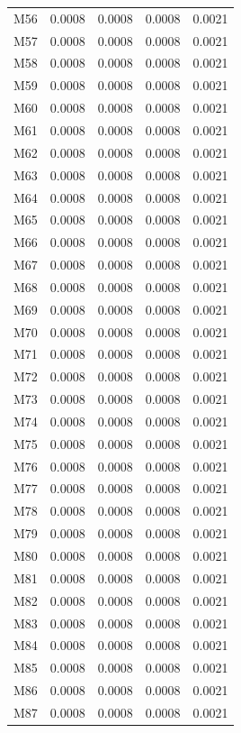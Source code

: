 \begin{longtable}{lrrrr}
M56 & 0.0008 & 0.0008 & 0.0008 & 0.0021 \\
M57 & 0.0008 & 0.0008 & 0.0008 & 0.0021 \\
M58 & 0.0008 & 0.0008 & 0.0008 & 0.0021 \\
M59 & 0.0008 & 0.0008 & 0.0008 & 0.0021 \\
M60 & 0.0008 & 0.0008 & 0.0008 & 0.0021 \\
M61 & 0.0008 & 0.0008 & 0.0008 & 0.0021 \\
M62 & 0.0008 & 0.0008 & 0.0008 & 0.0021 \\
M63 & 0.0008 & 0.0008 & 0.0008 & 0.0021 \\
M64 & 0.0008 & 0.0008 & 0.0008 & 0.0021 \\
M65 & 0.0008 & 0.0008 & 0.0008 & 0.0021 \\
M66 & 0.0008 & 0.0008 & 0.0008 & 0.0021 \\
M67 & 0.0008 & 0.0008 & 0.0008 & 0.0021 \\
M68 & 0.0008 & 0.0008 & 0.0008 & 0.0021 \\
M69 & 0.0008 & 0.0008 & 0.0008 & 0.0021 \\
M70 & 0.0008 & 0.0008 & 0.0008 & 0.0021 \\
M71 & 0.0008 & 0.0008 & 0.0008 & 0.0021 \\
M72 & 0.0008 & 0.0008 & 0.0008 & 0.0021 \\
M73 & 0.0008 & 0.0008 & 0.0008 & 0.0021 \\
M74 & 0.0008 & 0.0008 & 0.0008 & 0.0021 \\
M75 & 0.0008 & 0.0008 & 0.0008 & 0.0021 \\
M76 & 0.0008 & 0.0008 & 0.0008 & 0.0021 \\
M77 & 0.0008 & 0.0008 & 0.0008 & 0.0021 \\
M78 & 0.0008 & 0.0008 & 0.0008 & 0.0021 \\
M79 & 0.0008 & 0.0008 & 0.0008 & 0.0021 \\
M80 & 0.0008 & 0.0008 & 0.0008 & 0.0021 \\
M81 & 0.0008 & 0.0008 & 0.0008 & 0.0021 \\
M82 & 0.0008 & 0.0008 & 0.0008 & 0.0021 \\
M83 & 0.0008 & 0.0008 & 0.0008 & 0.0021 \\
M84 & 0.0008 & 0.0008 & 0.0008 & 0.0021 \\
M85 & 0.0008 & 0.0008 & 0.0008 & 0.0021 \\
M86 & 0.0008 & 0.0008 & 0.0008 & 0.0021 \\
M87 & 0.0008 & 0.0008 & 0.0008 & 0.0021 \\

\end{longtable}
